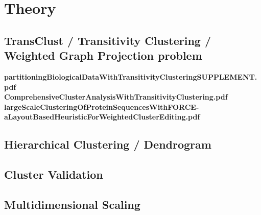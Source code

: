 \documentclass[a4paper,10pt]{article}
\begin{document}
\section{Theory}

\subsection{TransClust / Transitivity Clustering / Weighted Graph Projection problem}
\textbf{partitioningBiologicalDataWithTransitivityClusteringSUPPLEMENT.pdf} \\
\textbf{ComprehensiveClusterAnalysisWithTransitivityClustering.pdf} \\
\textbf{largeScaleClusteringOfProteinSequencesWithFORCE-aLayoutBasedHeuristicForWeightedClusterEditing.pdf} \\


\subsection{Hierarchical Clustering / Dendrogram}

\subsection{Cluster Validation}

\subsection{Multidimensional Scaling}

\newpage
\end{document}
